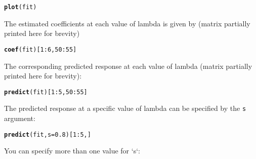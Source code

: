 \documentclass[12pt,letter]{article}\usepackage[]{graphicx}\usepackage[]{color}
\makeatletter
\newcommand{\hlnum}[1]{\textcolor[rgb]{0.686,0.059,0.569}{#1}}%
\newcommand{\hlopt}[1]{\textcolor[rgb]{0,0,0}{#1}}%
\newcommand{\hlstd}[1]{\textcolor[rgb]{0.345,0.345,0.345}{#1}}%
\newcommand{\hlkwc}[1]{\textcolor[rgb]{0.333,0.667,0.333}{#1}}%
\newcommand{\hlkwd}[1]{\textcolor[rgb]{0.737,0.353,0.396}{\textbf{#1}}}%
\newenvironment{kframe}{%
 \def\at@end@of@kframe{}%
 \ifinner\ifhmode%
  \def\at@end@of@kframe{\end{minipage}}%
  \begin{minipage}{\columnwidth}%
 \fi\fi%
 \def\FrameCommand##1{\hskip\@totalleftmargin \hskip-\fboxsep
 \colorbox{shadecolor}{##1}\hskip-\fboxsep
     \hskip-\linewidth \hskip-\@totalleftmargin \hskip\columnwidth}%
 \MakeFramed {\advance\hsize-\width
   \@totalleftmargin\z@ \linewidth\hsize
   \@setminipage}}%
 {\par\unskip\endMakeFramed%
 \at@end@of@kframe}
\newenvironment{knitrout}{}{} %
\makeatother
\begin{document}
\begin{knitrout}\scriptsize
{}\color{fgcolor}\begin{kframe}
\begin{alltt}
\hlkwd{plot}\hlstd{(fit)}
\end{alltt}
\end{kframe}
\end{knitrout}


The estimated coefficients at each value of lambda is given by (matrix partially printed here for brevity)

\begin{knitrout}\scriptsize
{}\color{fgcolor}\begin{kframe}
\begin{alltt}
\hlkwd{coef}\hlstd{(fit)[}\hlnum{1}\hlopt{:}\hlnum{6}\hlstd{,}\hlnum{50}\hlopt{:}\hlnum{55}\hlstd{]}
\end{alltt}
\end{kframe}
\end{knitrout}



The corresponding predicted response at each value of lambda (matrix partially printed here for brevity):

\begin{knitrout}\scriptsize
{}\color{fgcolor}\begin{kframe}
\begin{alltt}
\hlkwd{predict}\hlstd{(fit)[}\hlnum{1}\hlopt{:}\hlnum{5}\hlstd{,}\hlnum{50}\hlopt{:}\hlnum{55}\hlstd{]}
\end{alltt}
\end{kframe}
\end{knitrout}


The predicted response at a specific value of lambda can be specified by the \texttt{s} argument:

\begin{knitrout}\scriptsize
{}\color{fgcolor}\begin{kframe}
\begin{alltt}
\hlkwd{predict}\hlstd{(fit,} \hlkwc{s} \hlstd{=} \hlnum{0.8}\hlstd{)[}\hlnum{1}\hlopt{:}\hlnum{5}\hlstd{, ]}
\end{alltt}
\end{kframe}
\end{knitrout}


You can specify more than one value for `s`:
\end{document}
